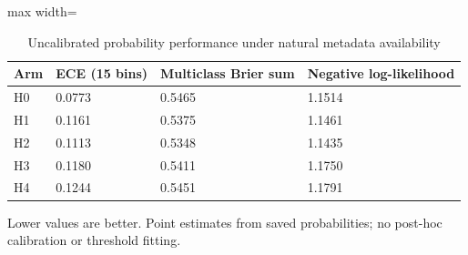 \begin{table}[t]
\centering
\small
\caption{Uncalibrated probability performance under natural metadata availability}
\label{tab:13-calibration}
\begin{adjustbox}{max width=\textwidth}
\begin{tabular}{llll}
\toprule
\textbf{Arm} & \textbf{ECE (15 bins)} & \textbf{Multiclass Brier sum} & \textbf{Negative log-likelihood} \\
\midrule
H0 & 0.0773 & 0.5465 & 1.1514 \\
H1 & 0.1161 & 0.5375 & 1.1461 \\
H2 & 0.1113 & 0.5348 & 1.1435 \\
H3 & 0.1180 & 0.5411 & 1.1750 \\
H4 & 0.1244 & 0.5451 & 1.1791 \\
\bottomrule
\end{tabular}
\end{adjustbox}
\par\smallskip
\begin{minipage}{\textwidth}\footnotesize Lower values are better. Point estimates from saved probabilities; no post-hoc calibration or threshold fitting.\end{minipage}
\end{table}
